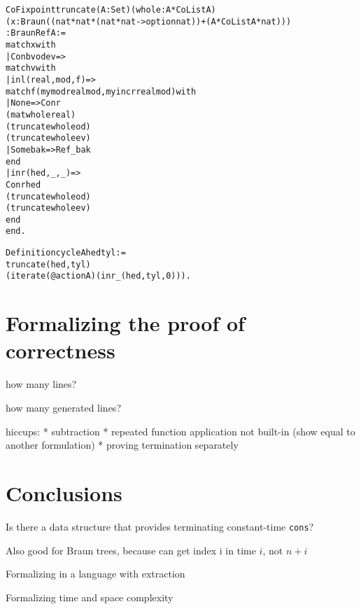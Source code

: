 \documentclass{llncs}
\begin{document}
\begin{alltt}
CoFixpoint truncate (A:Set) (whole:A * CoList A)
  (x:Braun ((nat*nat*(nat*nat->option nat))+(A * CoList A * nat)))
    : BraunRef A :=
    match x with
      | Conb v od ev =>
        match v with 
          | inl (real,mod,f) =>
            match f (mymod real mod,myincr real mod) with
              | None => Conr 
                        (mat whole real)
                        (truncate whole od)
                        (truncate whole ev)
              | Some bak => Ref _ bak
            end
          |inr (hed, _, _) =>
            Conr hed
            (truncate whole od)
            (truncate whole ev)
        end
    end.

Definition cycle A hed tyl :=
       truncate (hed,tyl) 
         (iterate (@action A) (inr _ (hed,tyl,0))).

\end{alltt}

\section{Formalizing the proof of correctness}

how many lines?

how many generated lines?

hiccups:
* subtraction
* repeated function application not built-in (show equal to another formulation)
* proving termination separately

\section{Conclusions}

Is there a data structure that provides terminating constant-time \verb|cons|?

Also good for Braun trees, because can get index i in time $i$, not $n+i$

Formalizing in a language with extraction

Formalizing time and space complexity



\end{document}
